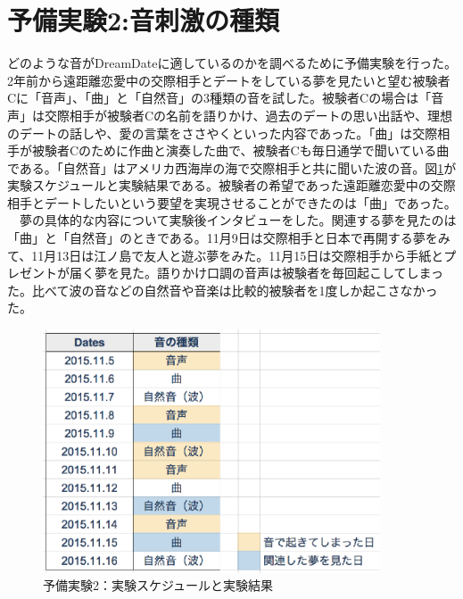 \section{予備実験2:音刺激の種類}
どのような音がDreamDateに適しているのかを調べるために予備実験を行った。2年前から遠距離恋愛中の交際相手とデートをしている夢を見たいと望む被験者Cに「音声」、「曲」と「自然音」の3種類の音を試した。被験者Cの場合は「音声」は交際相手が被験者Cの名前を語りかけ、過去のデートの思い出話や、理想のデートの話しや、愛の言葉をささやくといった内容であった。「曲」は交際相手が被験者Cのために作曲と演奏した曲で、被験者Cも毎日通学で聞いている曲である。「自然音」はアメリカ西海岸の海で交際相手と共に聞いた波の音。図\ref{experiment2}が実験スケジュールと実験結果である。被験者の希望であった遠距離恋愛中の交際相手とデートしたいという要望を実現させることができたのは「曲」であった。\\
　夢の具体的な内容について実験後インタビューをした。関連する夢を見たのは「曲」と「自然音」のときである。11月9日は交際相手と日本で再開する夢をみて、11月13日は江ノ島で友人と遊ぶ夢をみた。11月15日は交際相手から手紙とプレゼントが届く夢を見た。語りかけ口調の音声は被験者を毎回起こしてしまった。比べて波の音などの自然音や音楽は比較的被験者を1度しか起こさなかった。

\begin{figure}[htbp]
\begin{center}
\includegraphics[width=10cm]{eps/schedule1.eps}
\caption{予備実験2：実験スケジュールと実験結果}
\label{experiment2}
\end{center}
\end{figure}

